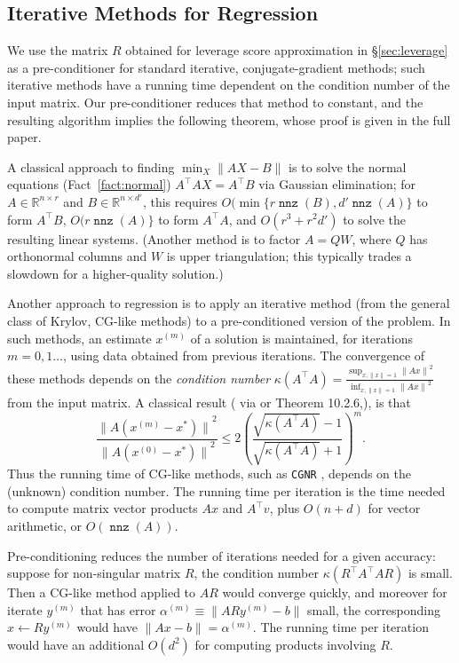 \documentclass{sig-alternate}
\newcommand{\norm}[1]{{\| #1 \|}}
\DeclareMathOperator{\nnz}{\mathtt{nnz}}
\newcommand{\R}{{\mathbb R}}
\begin{document}
\subsection{Iterative Methods for Regression}\label{subsec:iterative}

\ifSTOC
We use the matrix $R$ obtained for leverage score approximation
in \S\ref{sec:leverage} as a pre-conditioner for standard
iterative, conjugate-gradient methods; such iterative methods
have a running time dependent on the condition number
of the input matrix. Our pre-conditioner reduces that method to 
constant, and the resulting algorithm implies the following
theorem, whose proof is given in the full paper.
\else

A classical approach to finding $\min_{X} \norm{AX-B}$
is to solve the normal equations (Fact~\ref{fact:normal})
$A^\top A X = A^\top B$ via Gaussian elimination;
for $A\in\R^{n\times r}$ and $B\in\R^{n\times d'}$,
this requires $O(\min\{r\nnz(B), d'\nnz(A)\}$ to
form $A^\top B$, $O(r\nnz(A)\}$ to form $A^\top A$,
and $O(r^3 + r^2d')$ to solve the resulting linear systems.
(Another method is to factor $A=QW$,
where $Q$ has orthonormal columns and $W$ is
upper triangulation; this typically trades a slowdown for a higher-quality solution.)

Another approach to regression is to apply an iterative method
(from the general class of Krylov, CG-like methods) to a 
pre-conditioned version of the problem.  In such methods,
an estimate $x^{(m)}$ of a solution is maintained,
for iterations $m=0,1\ldots$,
using data obtained from previous iterations.
The convergence of these methods depends
on the \emph{condition number}
$\kappa(A^\top A)= \frac{\sup_{x,\norm{x}=1} \norm{Ax}^2}{\inf_{x,\norm{x}=1} \norm{Ax}^2}$
from the input matrix.
A classical result (\cite{Luen} via \cite{MSM} or Theorem 10.2.6,\cite{GvL}),
is that
\begin{equation}\label{eq:CG accuracy}
\frac{\norm{A(x^{(m)} - x^*)}^2}{\norm{A(x^{(0)} - x^*)}^2}
	\le 2\left(\frac{\sqrt{\kappa(A^\top A)} - 1}{\sqrt{\kappa(A^\top A)} + 1}\right)^m.
\end{equation}
Thus the running time of CG-like methods, such as {\tt CGNR} \cite{GvL},
depends on the (unknown)
condition number. The running time per iteration is the time needed
to compute matrix vector products $Ax$ and $A^\top v$,
plus $O(n+d)$ for vector arithmetic, or $O(\nnz(A))$.

Pre-conditioning reduces the number of iterations needed for a given accuracy:
suppose
for non-singular matrix $R$, the condition number $\kappa(R^\top A^\top AR)$
is small. Then a CG-like method applied to $AR$ would converge quickly,
and moreover for iterate $y^{(m)}$ that has error $\alpha^{(m)} \equiv \norm{ARy^{(m)} - b}$
small, the corresponding $x\gets Ry^{(m)}$ would have $\norm{Ax-b} = \alpha^{(m)}$.
The running time per iteration would have an
additional $O(d^2)$ for computing products involving $R$.
\end{document}
